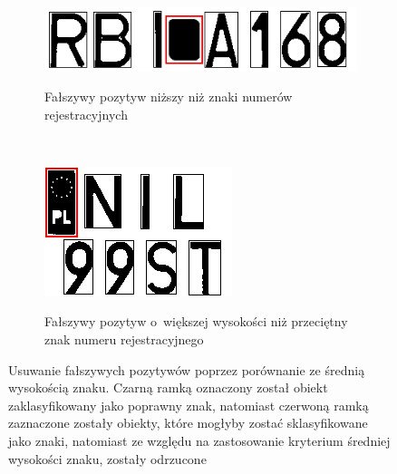 \begin{figure}
  \centering
  \begin{subfigure}[b]{0.65\textwidth}
    \includegraphics[width=\textwidth]{img/standard-deviation-condition-too-small}
    \label{fig:standard_deviation_too_small}
    \caption{Fałszywy pozytyw niższy niż znaki numerów rejestracyjnych}
  \end{subfigure}
  ~
  \begin{subfigure}[b]{0.40\textwidth}
    \includegraphics[width=\textwidth]{img/standard-deviation-condition-too-big}
    \label{fig:standard_deviation_too_big}
    \caption{Fałszywy pozytyw o~większej wysokości niż przeciętny znak numeru rejestracyjnego}
  \end{subfigure}
  \caption{Usuwanie fałszywych pozytywów poprzez porównanie ze średnią wysokością znaku. Czarną ramką oznaczony został obiekt zaklasyfikowany jako poprawny znak, natomiast czerwoną ramką zaznaczone zostały obiekty, które mogłyby zostać sklasyfikowane jako znaki, natomiast ze względu na zastosowanie kryterium średniej wysokości znaku, zostały odrzucone}
  \label{fig:standard_deviation_condition}
\end{figure}
